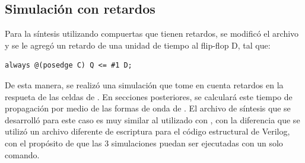 \subsection{Simulación con retardos}
Para la síntesis utilizando compuertas que tienen retardos, se modificó el archivo  y se le agregó un retardo de una unidad de tiempo al flip-flop D, tal que:

\begin{verbatim}
always @(posedge C) Q <= #1 D;
\end{verbatim}

De esta manera, se realizó una simulación que tome en cuenta retardos en la respueta de las celdas de .
En secciones posteriores, se calculará este tiempo de propagación por medio de las formas de onda de .
El archivo de síntesis que se desarrolló para este caso es muy similar al utilizado con , con la diferencia que se utilizó un archivo diferente de escriptura para el código estructural de Verilog, con el propósito de que las 3 simulaciones puedan ser ejecutadas con un solo comando.
